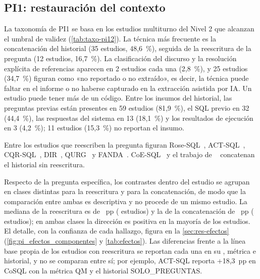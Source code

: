 \subsection{PI1: restauración del contexto}
\label{sec:res-pi1}



La taxonomía de PI1 se basa en los \nUmbral{} estudios multiturno del Nivel 2 que alcanzan el umbral de validez (\cref{tab:taxo-pi12}). La técnica más frecuente es la concatenación del historial (35 estudios, 48,6~\%), seguida de la reescritura de la pregunta (12 estudios, 16,7~\%). La clasificación del discurso y la resolución explícita de referencias aparecen en 2 estudios cada una (2,8~\%), y 25 estudios (34,7~\%) figuran como «no reportado o no extraído», es decir, la técnica puede faltar en el informe o no haberse capturado en la extracción asistida por IA. Un estudio puede tener más de un código. Entre los insumos del historial, las preguntas previas están presentes en 59 estudios (81,9~\%), el SQL previo en 32 (44,4~\%), las respuestas del sistema en 13 (18,1~\%) y los resultados de ejecución en 3 (4,2~\%); 11 estudios (15,3~\%) no reportan el insumo.

Entre los estudios que reescriben la pregunta figuran Rose-SQL~\cite{Zhou2026RoseSQL}, ACT-SQL~\cite{Zhang2023ACTSQL}, CQR-SQL~\cite{Xiao2022CQRSQL}, DIR~\cite{Li2023DIR}, QURG~\cite{Chai2023QURG} y FANDA~\cite{Liu2019FANDA}. CoE-SQL~\cite{Zhang2024CoESQL} y el trabajo de ~\cite{Liu2022Augmenting} concatenan el historial sin reescritura.

Respecto de la pregunta específica, los contrastes dentro del estudio se agrupan en clases distintas para la reescritura y para la concatenación, de modo que la comparación entre ambas es descriptiva y no procede de un mismo estudio. La mediana de la reescritura es de \efReescMed{}~pp (\efReescN{} estudios) y la de la concatenación de \efConcatMed{}~pp (\efConcatN{} estudios); en ambas clases la dirección es positiva en la mayoría de los estudios. El detalle, con la confianza de cada hallazgo, figura en la \cref{sec:res-efectos} (\cref{fig:pi_efectos_componentes} y \cref{tab:efectos}). Las diferencias frente a la línea base propia de los estudios con reescritura se reportan cada una en su , métrica e historial, y no se comparan entre sí; por ejemplo, ACT-SQL reporta +18,3~pp en CoSQL con la métrica QM y el historial SOLO\_PREGUNTAS.

